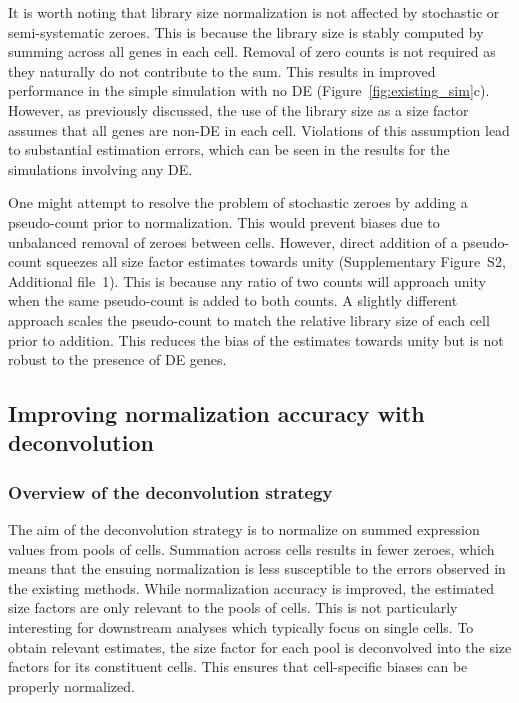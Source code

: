\documentclass{bmcart}
\newcommand{\supppseudo}{S2}
\newcommand{\revised}[1]{#1}
\begin{document}
It is worth noting that library size normalization is not affected by stochastic or semi-systematic zeroes.
This is because the library size is stably computed by summing across all genes in each cell.
Removal of zero counts is not required as they naturally do not contribute to the sum.
This results in improved performance in the simple simulation with no DE (Figure~\ref{fig:existing_sim}c).
However, as previously discussed, the use of the library size as a size factor assumes that all genes are non-DE in each cell.
Violations of this assumption lead to substantial estimation errors, which can be seen in the results for the simulations involving any DE.

One might attempt to resolve the problem of stochastic zeroes by adding a pseudo-count prior to normalization.
This would prevent biases due to unbalanced removal of zeroes between cells.
However, direct addition of a pseudo-count squeezes all size factor estimates towards unity (Supplementary Figure~\supppseudo{}, Additional file~1).
This is because any ratio of two counts will approach unity when the same pseudo-count is added to both counts.
A slightly different approach scales the pseudo-count to match the \revised{relative} library size of each cell \revised{prior to addition}.
This \revised{reduces the bias of the estimates towards unity but is not robust to the presence of DE genes}.

\subsection*{Improving normalization accuracy with deconvolution}

\subsubsection*{Overview of the deconvolution strategy}
The aim of the deconvolution strategy is to normalize on summed expression values from pools of cells.
Summation across cells results in fewer zeroes, which means that the ensuing normalization is less susceptible to the errors observed \revised{in the} existing methods.
While normalization accuracy is improved, the estimated size factors are only relevant to the pools of cells.
This is not particularly interesting for downstream analyses which typically focus on single cells.
To obtain relevant estimates, the size factor for each pool is deconvolved into the size factors for its constituent cells.
This ensures that cell-specific biases can be properly normalized.
\end{document}
